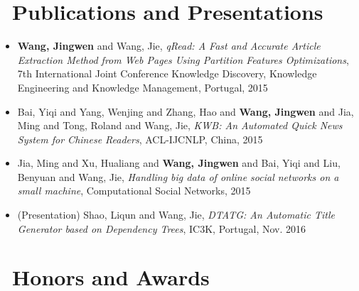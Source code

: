 \documentclass{resume}
\begin{document}





\section{\faPaperclip \ Publications and Presentations}

\begin{itemize}
  \item \textbf{Wang, Jingwen} and Wang, Jie, \textit{qRead: A Fast and Accurate Article Extraction Method from Web Pages Using Partition Features Optimizations}, 7th International Joint Conference Knowledge Discovery, Knowledge Engineering and Knowledge Management, Portugal, 2015
  \item Bai, Yiqi and Yang, Wenjing and Zhang, Hao and \textbf{Wang, Jingwen} and Jia, Ming and Tong, Roland and Wang, Jie, \textit{KWB: An Automated Quick News System for Chinese Readers}, ACL-IJCNLP, China, 2015
  \item Jia, Ming and Xu, Hualiang and \textbf{Wang, Jingwen} and Bai, Yiqi and Liu, Benyuan and Wang, Jie, \textit{Handling big data of online social networks on a small machine}, Computational Social Networks, 2015
  \item (Presentation) Shao, Liqun and Wang, Jie, \textit{DTATG: An Automatic Title Generator based on Dependency Trees}, IC3K, Portugal, Nov. 2016

\end{itemize}



\section{\faHeartO\ Honors and Awards}
\end{document}
